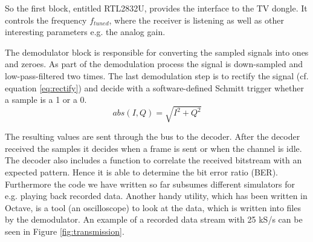 \documentclass[conference]{IEEEtran}
\begin{document}
So the first block, entitled RTL2832U, provides the interface to the TV
dongle. It controls the frequency \ensuremath{f_{tuned}}, where the
receiver is listening as well as other interesting parameters e.g. the analog gain.

The demodulator block is responsible for converting the sampled signals
into ones and zeroes. 
As part of the demodulation process the signal is down-sampled and
low-pass-filtered two times. The last demodulation step is to rectify
the signal (cf. equation \ref{eq:rectify}) and decide with a
software-defined Schmitt trigger whether a sample is a 1 or a 0.  
\begin{equation}
	\label{eq:rectify}
	abs(I,Q) = \sqrt{I^2 +  Q^2}
\end{equation} 

The resulting values are sent through the bus to the decoder. After the decoder
received the samples it decides when a frame is sent or when the channel is
idle. The decoder also includes a function to correlate the received bitstream
with an expected pattern. Hence it is able to determine the bit error ratio
(BER). Furthermore the code we have written so far subsumes different
simulators for e.g. playing back recorded data. Another handy utility, which
has been written in Octave, is a tool (an oscilloscope) to look at the data,
which is written into files by the demodulator. An example of a recorded data
stream with 25 kS/s can be seen in Figure \ref{fig:transmission}.  
\end{document}
